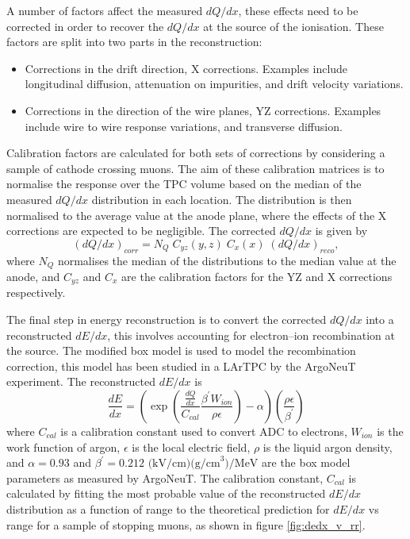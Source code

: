 A number of factors affect the measured $dQ/dx$, these effects need to be 
corrected in order to recover the $dQ/dx$ at the source of the ionisation. 
These factors are split into two parts in the \protodune{} reconstruction:
\begin{itemize}
	\item Corrections in the drift direction, X corrections. Examples include 
		longitudinal diffusion, attenuation on impurities, and drift velocity
		variations.
	\item Corrections in the direction of the wire planes, YZ corrections.
		Examples include wire to wire response variations, and transverse diffusion.
\end{itemize}
Calibration factors are calculated for both sets of corrections by considering a
sample of cathode crossing muons. The aim of these calibration matrices is to 
normalise the response over the TPC volume based on the median of the measured
$dQ/dx$ distribution in each location. The distribution is then normalised to 
the average value at the anode plane, where the effects of the X corrections are
expected to be negligible. The corrected $dQ/dx$ is given by
\begin{equation*}
	\left( dQ/dx \right)_{corr} = N_Q \; C_{yz}(y, z) \; C_x(x) \; \left( dQ/dx
	\right)_{reco},
\end{equation*}
where $N_Q$ normalises the median of the distributions to the median value at
the anode, and $C_{yz}$ and $C_{x}$ are the calibration factors for the YZ and 
X corrections respectively.

The final step in energy reconstruction is to convert the corrected $dQ/dx$ into
a reconstructed $dE/dx$, this involves accounting for electron--ion
recombination at the source. The modified box model is used to model the
recombination correction, this model has been studied in a LArTPC by the 
ArgoNeuT experiment\cite{Acciarri2013a}. The reconstructed $dE/dx$ is 
\begin{equation*}
	\frac{dE}{dx} = \left( \exp \left( \frac{\frac{dQ}{dx}}{C_{cal}} \frac{\beta^\prime
	W_{ion}}{\rho \epsilon} \right) - \alpha \right)
	\left( \frac{\rho \epsilon}{\beta^\prime} \right)
\end{equation*}
where $C_{cal}$ is a calibration constant used to convert ADC to electrons,
$W_{ion}$ is the work function of argon, $\epsilon$ is the local electric field,
$\rho$ is the liquid argon density, and \(\alpha = 0.93\) and 
\(\beta^\prime = 0.212 \mbox{ (kV/cm)(g/cm}^3) / \mbox{MeV}\) are the box model 
parameters as measured by ArgoNeuT. The calibration constant, $C_{cal}$ is 
calculated by fitting the most probable value of the reconstructed $dE/dx$ 
distribution as a function of range to the theoretical prediction for $dE/dx$ 
vs range for a sample of stopping muons, as shown in figure \ref{fig:dedx_v_rr}.


